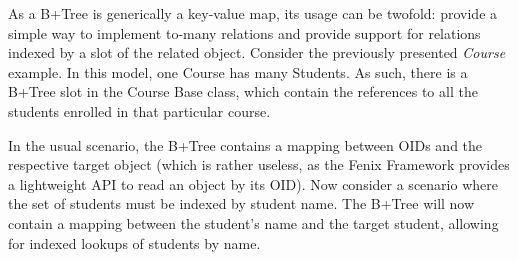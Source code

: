 As a B+Tree is generically a key-value map, its usage can be twofold:
provide a simple way to implement to-many relations and provide
support for relations indexed by a slot of the related
object. Consider the previously presented {\it Course} example. In
this model, one Course has many Students. As such, there is a B+Tree
slot in the Course Base class, which contain the references to all the
students enrolled in that particular course.

In the usual scenario, the B+Tree contains a mapping between OIDs and
the respective target object (which is rather useless, as the Fenix
Framework provides a lightweight API to read an object by its OID).
Now consider a scenario where the set of students must be indexed by
student name. The B+Tree will now contain a mapping between the
student's name and the target student, allowing for indexed lookups of
students by name.

